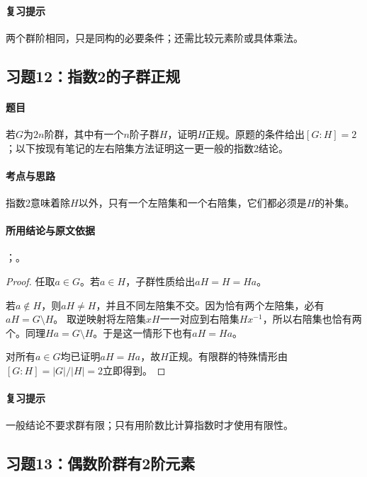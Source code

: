 \paragraph{复习提示}
两个群阶相同，只是同构的必要条件；还需比较元素阶或具体乘法。


\subsection{习题12：\texorpdfstring{指数2的子群正规}{指数2的子群正规}}
\label{ex:1:12}

\paragraph{题目}
若$G$为$2n$阶群，其中有一个$n$阶子群$H$，证明$H$正规。原题的条件给出$[G:H]=2$；以下按现有笔记的左右陪集方法证明这一更一般的指数2结论。

\paragraph{考点与思路}
指数2意味着除$H$以外，只有一个左陪集和一个右陪集，它们都必须是$H$的补集。

\paragraph{所用结论与原文依据}
；。


\begin{proof}
任取$a\in G$。若$a\in H$，子群性质给出$aH=H=Ha$。

若$a\notin H$，则$aH\ne H$，并且不同左陪集不交。因为恰有两个左陪集，必有$aH=G\setminus H$。
取逆映射将左陪集$xH$一一对应到右陪集$Hx^{-1}$，所以右陪集也恰有两个。同理$Ha=G\setminus H$。于是这一情形下也有$aH=Ha$。

对所有$a\in G$均已证明$aH=Ha$，故$H$正规。有限群的特殊情形由$[G:H]=|G|/|H|=2$立即得到。
\end{proof}

\paragraph{复习提示}
一般结论不要求群有限；只有用阶数比计算指数时才使用有限性。


\subsection{习题13：\texorpdfstring{偶数阶群有2阶元素}{偶数阶群有2阶元素}}
\label{ex:1:13}

